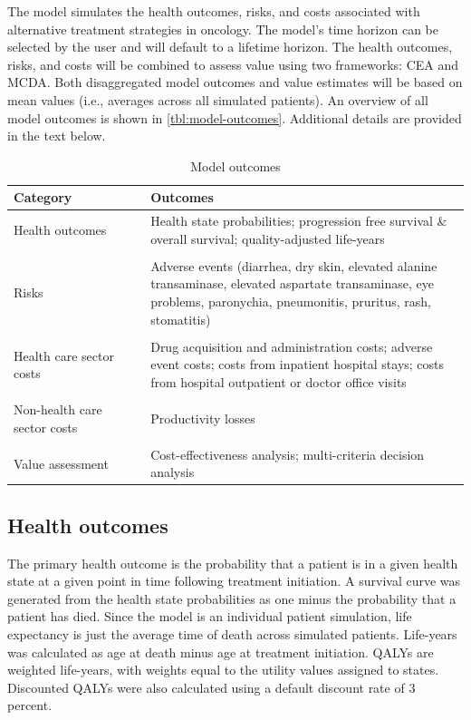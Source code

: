\documentclass[11pt,final,fleqn]{article}\usepackage[]{graphicx}\usepackage[]{color}
\theoremstyle{plain}
\begin{document}
{The model simulates the health outcomes, risks, and costs associated with alternative treatment strategies in oncology. The model's time horizon can be selected by the user and will default to a lifetime horizon. The health outcomes, risks, and costs will be combined to assess value using two frameworks: CEA and MCDA. Both disaggregated model outcomes and value estimates will be based on mean values (i.e., averages across all simulated patients). An overview of all model outcomes is shown in \autoref{tbl:model-outcomes}. Additional details are provided in the text below.  

\begin{table}[!ht]
\begin{center}
\begin{threeparttable}
\caption{Model outcomes} \label{tbl:model-outcomes}
\begin{tabular}{p{0.3\linewidth}p{0.7\linewidth}}
\hline
\multicolumn{1}{l}{Category} & \multicolumn{1}{l}{Outcomes}\\
\hline
Health outcomes & Health state probabilities; progression free survival \& overall survival; quality-adjusted life-years\\
&\\
Risks & Adverse events (diarrhea, dry skin, elevated alanine transaminase, elevated aspartate transaminase, eye problems, paronychia, pneumonitis, pruritus, rash, stomatitis)\\
&\\
Health care sector costs & Drug acquisition and administration costs; adverse event costs; costs from inpatient hospital stays; costs from hospital outpatient or doctor office visits\\
&\\
Non-health care sector costs & Productivity losses \\
&\\
Value assessment & Cost-effectiveness analysis; multi-criteria decision analysis\\
\hline
\end{tabular}
\scriptsize
\end{threeparttable}
\end{center}
\end{table}

\subsection{Health outcomes}

The primary health outcome is the probability that a patient is in a given health state at a given point in time following treatment initiation. A survival curve was generated from the health state probabilities as one minus the probability that a patient has died. Since the model is an individual patient simulation, life expectancy is just the average time of death across simulated patients. Life-years was calculated as age at death minus age at treatment initiation. QALYs are weighted life-years, with weights equal to the utility values assigned to states.  Discounted QALYs were also calculated using a default discount rate of 3 percent.

}
\end{document}
